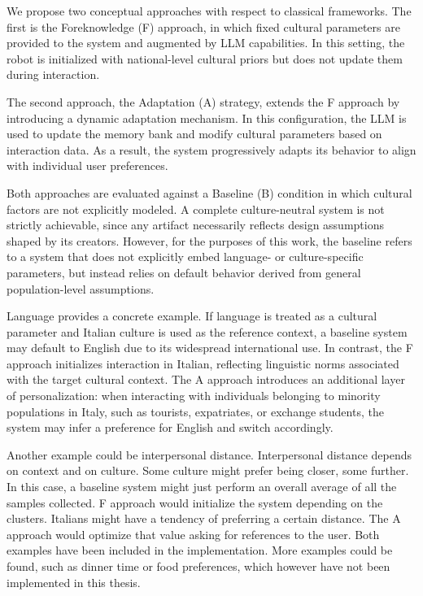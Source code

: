 We propose two conceptual approaches with respect to classical frameworks. The first is the Foreknowledge (F) approach, in which fixed cultural parameters are provided to the system and augmented by LLM capabilities. In this setting, the robot is initialized with national-level cultural priors but does not update them during interaction.

The second approach, the Adaptation (A) strategy, extends the F approach by introducing a dynamic adaptation mechanism. In this configuration, the LLM is used to update the memory bank and modify cultural parameters based on interaction data. As a result, the system progressively adapts its behavior to align with individual user preferences.

Both approaches are evaluated against a Baseline (B) condition in which cultural factors are not explicitly modeled. A complete culture-neutral system is not strictly achievable, since any artifact necessarily reflects design assumptions shaped by its creators. However, for the purposes of this work, the baseline refers to a system that does not explicitly embed language- or culture-specific parameters, but instead relies on default behavior derived from general population-level assumptions.

Language provides a concrete example. If language is treated as a cultural parameter and Italian culture is used as the reference context, a baseline system may default to English due to its widespread international use. In contrast, the F approach initializes interaction in Italian, reflecting linguistic norms associated with the target cultural context. The A approach introduces an additional layer of personalization: when interacting with individuals belonging to minority populations in Italy, such as tourists, expatriates, or exchange students, the system may infer a preference for English and switch accordingly.

Another example could be interpersonal distance. Interpersonal distance depends on context and on culture. Some culture might prefer being closer, some further. In this case, a baseline system might just perform an overall average of all the samples collected. F approach would initialize the system depending on the clusters. Italians might have a tendency of preferring a certain distance. The A approach would optimize that value asking for references to the user. 
Both examples have been included in the implementation. 
More examples could be found, such as dinner time or food preferences, which however have not been implemented in this thesis.

